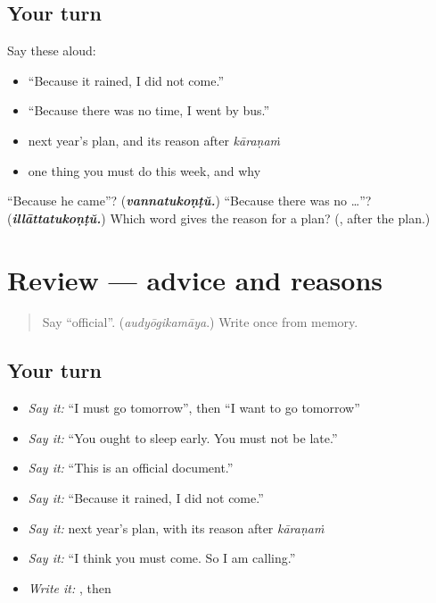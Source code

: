 \subsection*{Your turn}
Say these aloud:

\begin{itemize}
\raggedright
  \item \textquotedblleft{}Because it rained, I did not come.\textquotedblright{}
  \item \textquotedblleft{}Because there was no time, I went by bus.\textquotedblright{}
  \item next year's plan, and its reason after \emph{kāraṇaṁ}
  \item one thing you must do this week, and why
\end{itemize}

\begin{tcolorbox}[breakable,colback=teal!4,colframe=teal!35!black,title={Before you move on}]
\textquotedblleft{}Because he came\textquotedblright{}? (\emph{\textbf{vannatukoṇṭŭ.}}) \textquotedblleft{}Because there was no …\textquotedblright{}? (\emph{\textbf{illāttatukoṇṭŭ.}}) Which word gives the reason for a plan? (\textbf{}, after the plan.)
\end{tcolorbox}
\section[(review)]{Review — advice and reasons}

\label{lesson:ML-R342-advice-and-reasons}



\begin{quote}
Say \textquotedblleft{}official\textquotedblright{}. (\emph{audyōgikamāya}.) Write \textbf{} once from memory.
\end{quote}

\subsection*{Your turn}
\begin{itemize}
\raggedright
  \item \emph{Say it:} \textquotedblleft{}I must go tomorrow\textquotedblright{}, then \textquotedblleft{}I want to go tomorrow\textquotedblright{}
  \item \emph{Say it:} \textquotedblleft{}You ought to sleep early. You must not be late.\textquotedblright{}
  \item \emph{Say it:} \textquotedblleft{}This is an official document.\textquotedblright{}
  \item \emph{Say it:} \textquotedblleft{}Because it rained, I did not come.\textquotedblright{}
  \item \emph{Say it:} next year's plan, with its reason after \emph{kāraṇaṁ}
  \item \emph{Say it:} \textquotedblleft{}I think you must come. So I am calling.\textquotedblright{}
  \item \emph{Write it:} \textbf{ }, then \textbf{}
\end{itemize}

